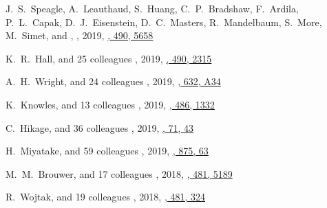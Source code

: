 \begin{etaremune}
\item
J.~S.~Speagle, A.~Leauthaud, S.~Huang, C.~P.~Bradshaw, F.~Ardila, P.~L.~Capak, D.~J.~Eisenstein, D.~C.~Masters, R.~Mandelbaum, S.~More, M.~Simet, and \myself,
,
2019, \href{https://ui.adsabs.harvard.edu/abs/2019MNRAS.490.5658S}{\mnras, 490, 5658}

\item
K.~R.~Hall, and 25 colleagues
,
2019, \href{https://ui.adsabs.harvard.edu/abs/2019MNRAS.490.2315H}{\mnras, 490, 2315}

\item
A.~H.~Wright, and 24 colleagues
,
2019, \href{https://ui.adsabs.harvard.edu/abs/2019A&A...632A..34W}{\aap, 632, A34}

\item
K.~Knowles, and 13 colleagues
,
2019, \href{https://ui.adsabs.harvard.edu/abs/2019MNRAS.486.1332K}{\mnras, 486, 1332}

\item
C.~Hikage, and 36 colleagues
,
2019, \href{https://ui.adsabs.harvard.edu/abs/2019PASJ...71...43H}{\pasj, 71, 43}

\item
H.~Miyatake, and 59 colleagues
,
2019, \href{https://ui.adsabs.harvard.edu/abs/2019ApJ...875...63M}{\apj, 875, 63}

\item
M.~M.~Brouwer, and 17 colleagues
,
2018, \href{https://ui.adsabs.harvard.edu/abs/2018MNRAS.481.5189B}{\mnras, 481, 5189}

\item
R.~Wojtak, and 19 colleagues
,
2018, \href{https://ui.adsabs.harvard.edu/abs/2018MNRAS.481..324W}{\mnras, 481, 324}


\end{etaremune}
